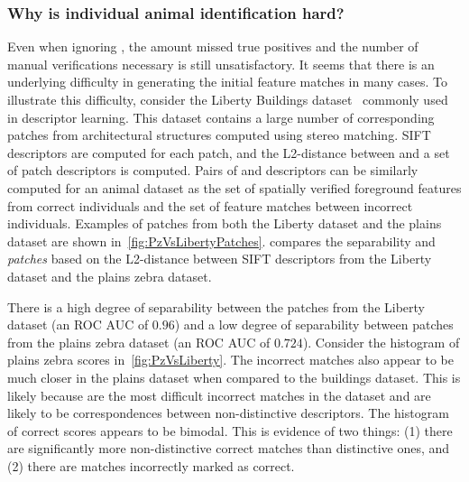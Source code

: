     \subsubsection{Why is individual animal identification hard?}\label{sub:whyhard}
        Even when ignoring \photobombings{}, the amount missed true positives and the number of manual
          verifications necessary is still unsatisfactory.
        It seems that there is an underlying difficulty in generating the initial feature matches in many cases.
        To illustrate this difficulty, consider the Liberty Buildings dataset~\cite{brown_discriminative_2011}
          commonly used in descriptor learning.
        This dataset contains a large number of corresponding patches from architectural structures computed
          using stereo matching.
        SIFT descriptors are computed for each patch, and the L2-distance between \groundtrue{} and a set of
          \groundfalse{} patch descriptors is computed.
        Pairs of \groundtrue{} and \groundfalse{} descriptors can be similarly computed for an animal dataset as
          the set of spatially verified foreground features from correct individuals and the set of feature matches
          between incorrect individuals.
        Examples of patches from both the Liberty dataset and the plains dataset are shown
          in~\cref{fig:PzVsLibertyPatches}.
         compares the separability \groundtrue{} and \groundfalse{} \emph{patches} based on
          the L2-distance between SIFT descriptors from the Liberty dataset and the plains zebra dataset.

        There is a high degree of separability between the patches from the Liberty dataset (an ROC AUC of
          $0.96$) and a low degree of separability between patches from the plains zebra dataset (an ROC AUC of
          $0.724$).
        Consider the histogram of plains zebra scores in~\cref{fig:PzVsLiberty}.
        The incorrect matches also appear to be much closer in the plains dataset when compared to the buildings
          dataset.
        This is likely because are the most difficult incorrect matches in the dataset and are likely to be
          correspondences between non-distinctive descriptors.
        The histogram of correct scores appears to be bimodal.
        This is evidence of two things:
        (1) there are significantly more non-distinctive correct matches than distinctive ones, and
        (2) there are matches incorrectly marked as correct.

